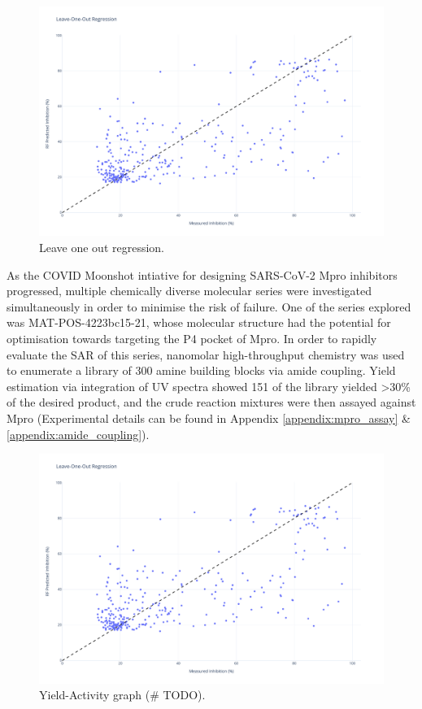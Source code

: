 \begin{figure}
    \centering
    \includegraphics[width=\textwidth]{Chapters/Crude/Figs/rf.pdf}
    \caption{Leave one out regression.}
    \label{fig:leave-one-out}
\end{figure}

As the COVID Moonshot intiative for designing SARS-CoV-2 Mpro inhibitors progressed, multiple chemically diverse molecular series were investigated simultaneously in order to minimise the risk of failure. One of the series explored was MAT-POS-4223bc15-21, whose molecular structure had the potential for optimisation towards targeting the P4 pocket of Mpro. In order to rapidly evaluate the SAR of this series, nanomolar high-throughput chemistry was used to enumerate a library of 300 amine building blocks via amide coupling. Yield estimation via integration of UV spectra showed 151 of the library yielded >30\% of the desired product, and the crude reaction mixtures were then assayed against Mpro (Experimental details can be found in Appendix \ref{appendix:mpro_assay} \& \ref{appendix:amide_coupling}).

\begin{figure}
    \centering
    \includegraphics[width=\textwidth]{Chapters/Crude/Figs/rf.pdf}
    \caption{Yield-Activity graph (\# TODO).}
    \label{fig:yield_activity}
\end{figure}

